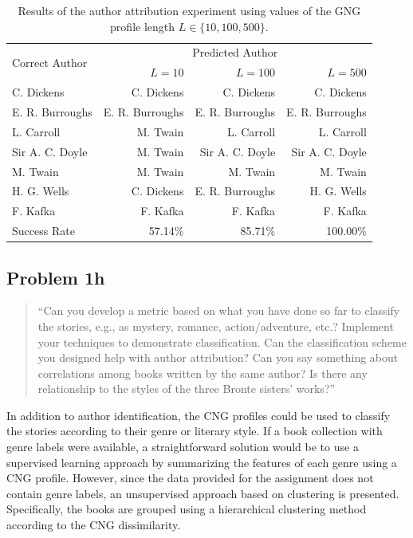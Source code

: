 \documentclass[conference]{IEEEtran}
\begin{document}
\begin{table}[htb]
\caption{\hspace{1.4em}Results of the author attribution experiment using \newline
values of the GNG profile length $L\in\{10,100,500\}$.\label{tab:problem1g}}
\vspace{-10pt}
\begin{center}
\begin{tabular}{lr@{\hspace{1em}}r@{\hspace{1em}}r}
\hline 
\multirow{2}{*}{Correct Author} & \multicolumn{3}{c}{Predicted Author}\tabularnewline
\cline{2-4} 
 & $L=10$ & $L=100$ & $L=500$\tabularnewline
\hline
C. Dickens & C. Dickens & C. Dickens & C. Dickens \\
E. R. Burroughs & E. R. Burroughs & E. R. Burroughs & E. R. Burroughs \\
L. Carroll & M. Twain & L. Carroll & L. Carroll \\
Sir A. C. Doyle & M. Twain & Sir A. C. Doyle & Sir A. C. Doyle \\
M. Twain & M. Twain & M. Twain & M. Twain \\
H. G. Wells & C. Dickens & E. R. Burroughs & H. G. Wells \\
F. Kafka & F. Kafka & F. Kafka & F. Kafka \\
\hline
Success Rate & 57.14\% & 85.71\% & 100.00\%\\
\hline
\end{tabular}
\end{center}
\end{table} 
    

\subsection{Problem 1h}

\begin{quote}
``Can you develop a metric based on what you have done so far to classify the stories, e.g., as mystery, romance, action/adventure, etc.? 
Implement your techniques to demonstrate classification. 
Can the classification scheme you designed help with author attribution?
Can you say something about correlations among books written by the same author?
Is there any relationship to the styles of the three Bronte sisters' works?''
\end{quote}
\vspace{0.75em}

In addition to author identification, the CNG profiles could be used to classify the stories according to their genre or literary style.
If a book collection with genre labels were available, a straightforward solution would be to use a supervised learning approach by summarizing the features of each genre using a CNG profile.
However, since the data provided for the assignment does not contain genre labels, an unsupervised approach based on clustering is presented.
Specifically, the books are grouped using a hierarchical clustering method according to the CNG dissimilarity.
\end{document}
